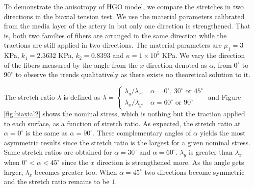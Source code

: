 To demonstrate the anisotropy of HGO model, we compare the stretches in two directions in the biaxial tension test. We use the material parameters calibrated from the media layer of the artery in \cite{Holzapfel2} but only one direction is strengthened. That is, both two families of fibers are arranged in the same direction while the tractions are still applied in two directions. The material parameters are $\mu_1 = 3$ KPa, $k_1 = 2.3632$ KPa, $k_2 = 0.8393$ and $\kappa = 1 \times 10^5$ KPa. We vary the direction of the fibers measured by the angle from the $x$ direction denoted as $\alpha$, from $0^\circ$ to $90^\circ$ to observe the trends qualitatively as there exists no theoretical solution to it. 

The stretch ratio $\lambda$ is defined as $\lambda = 
\begin{cases}
	\lambda_y/\lambda_x, & \text{$\alpha = 0^\circ$, $30^\circ$ or $45^\circ$} \\
	\lambda_x/\lambda_y, & \text{$\alpha = 60^\circ$ or $90^\circ$}
\end{cases}
$ 
and Figure \ref{fig:biaxial2} shows the nominal stress, which is nothing but the traction applied to each surface, as a function of stretch ratio. As expected, the stretch ratio at $\alpha = 0^\circ$ is the same as $\alpha = 90^\circ$. These complementary angles of $\alpha$ yields the most asymmetric results since the stretch ratio is the largest for a given nominal stress. Same stretch ratios are obtained for $\alpha = 30^\circ$ and $\alpha = 60^\circ$. 
$\lambda_y$ is greater than $\lambda_x$ when $0^\circ < \alpha < 45^\circ$ since the $x$ direction is strengthened more. As the angle gets larger, $\lambda_x$ becomes greater too. When $\alpha = 45^\circ$ two directions become symmetric and the stretch ratio remains to be $1$.
 

